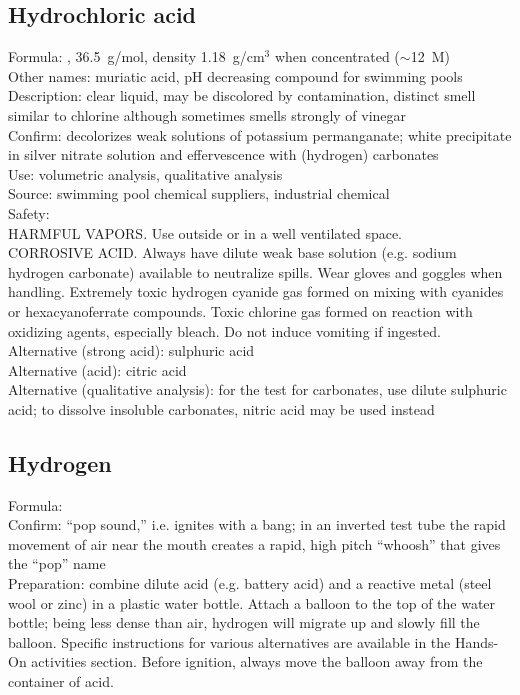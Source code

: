 \subsection*{Hydrochloric acid}
\label{sec:hydroacid}
Formula: , 
36.5~g/mol, 
density 1.18~g/cm$^{3}$ when concentrated ($\sim$12~M)\\
Other names: muriatic acid, 
pH decreasing compound for swimming pools\\
Description: clear liquid, 
may be discolored by contamination, 
distinct smell similar to chlorine 
although sometimes smells strongly of vinegar\\
Confirm: decolorizes weak solutions of potassium permanganate; 
white precipitate in silver nitrate solution 
and effervescence with (hydrogen) carbonates\\
Use: volumetric analysis, 
qualitative analysis\\
Source: swimming pool chemical suppliers, industrial chemical\\ 
Safety: \\HARMFUL VAPORS. 
Use outside or in a well ventilated space. 
\\CORROSIVE ACID. 
Always have dilute weak base solution (e.g. 
sodium hydrogen carbonate) available to neutralize spills. 
Wear gloves and goggles when handling. 
Extremely toxic hydrogen cyanide gas formed 
on mixing with cyanides or hexacyanoferrate compounds. 
Toxic chlorine gas formed on reaction with oxidizing agents, 
especially bleach. 
Do not induce vomiting if ingested.\\
Alternative (strong acid): sulphuric acid\\
Alternative (acid): citric acid\\
Alternative (qualitative analysis): for the test for carbonates, 
use dilute sulphuric acid; 
to dissolve insoluble carbonates, 
nitric acid may be used instead
\subsection*{Hydrogen}
Formula: \\
Confirm: ``pop sound,'' i.e. 
ignites with a bang; 
in an inverted test tube the rapid movement of air 
near the mouth creates a rapid, 
high pitch ``whoosh'' that gives the ``pop'' name\\
Preparation: combine dilute acid (e.g. 
battery acid) and a reactive metal (steel wool or zinc) 
in a plastic water bottle. 
Attach a balloon to the top of the water bottle; 
being less dense than air, 
hydrogen will migrate up and slowly fill the balloon. 
Specific instructions for various alternatives are available 
in the Hands-On activities section. 
Before ignition, 
always move the balloon away from the container of acid.

